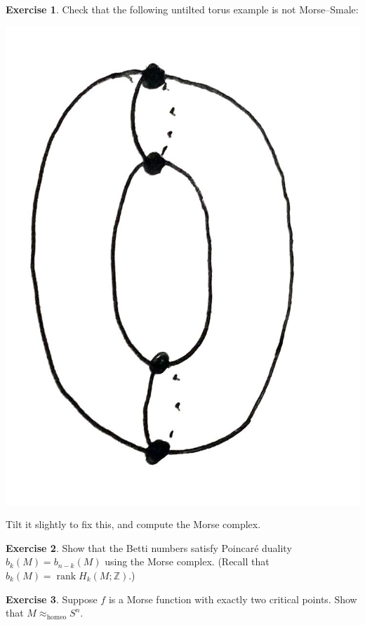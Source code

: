 \documentclass{article}
\theoremstyle{definition}
\newtheorem*{exercise}{Exercise}
\DeclareMathOperator{\rank}{rank}
\newcommand{\homeo}{\mathrm{homeo}}
\newcommand{\Z}{\mathbb{Z}}
\begin{document}
\begin{exercise}
    Check that the following untilted torus example is not Morse--Smale:
    \begin{center}
        \includegraphics[scale=0.1]{morse_smale}
    \end{center}
    Tilt it slightly to fix this, and compute the Morse complex.
\end{exercise}

\begin{exercise}
    Show that the Betti numbers satisfy Poincar\'e duality
    $b_k(M)=b_{n-k}(M)$ using the Morse complex. (Recall that
    $b_k(M)=\rank H_k(M;\Z)$.)
\end{exercise}

\begin{exercise}
    Suppose $f$ is a Morse function with exactly two critical points. Show
    that $M\approx_\homeo S^n$.
\end{exercise}
\end{document}
